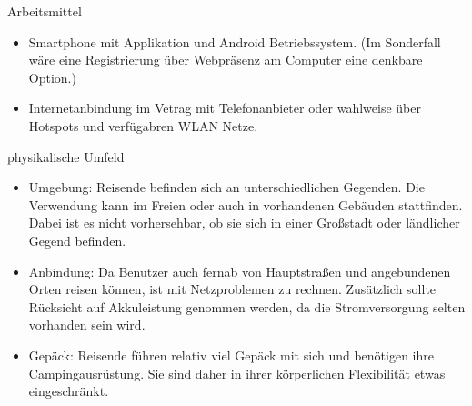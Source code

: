 Arbeitsmittel
\begin{itemize}
   \item 
   Smartphone mit Applikation und Android Betriebssystem. (Im Sonderfall wäre eine Registrierung über Webpräsenz am Computer eine denkbare Option.) 
   \item  
   Internetanbindung im Vetrag mit Telefonanbieter oder wahlweise über Hotspots und verfügabren WLAN Netze.\\
   

\end{itemize}


physikalische Umfeld
\begin{itemize}

   \item 
   Umgebung: Reisende befinden sich an unterschiedlichen Gegenden. Die Verwendung kann im Freien oder auch in vorhandenen Gebäuden stattfinden. Dabei ist es nicht vorhersehbar, ob sie sich in einer Großstadt oder ländlicher Gegend befinden.

   \item
   Anbindung: Da Benutzer auch fernab von Hauptstraßen und angebundenen Orten reisen können, ist mit Netzproblemen zu rechnen. Zusätzlich sollte Rücksicht auf Akkuleistung genommen werden, da die Stromversorgung selten vorhanden sein wird. 

   \item
   Gepäck: Reisende führen relativ viel Gepäck mit sich und benötigen ihre Campingausrüstung. Sie sind daher in ihrer körperlichen Flexibilität etwas eingeschränkt.
\end{itemize}



